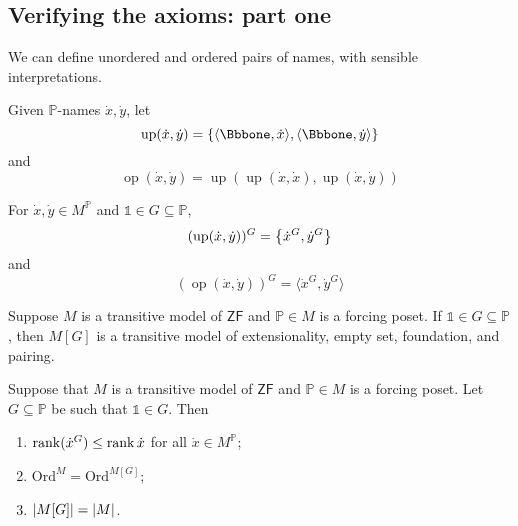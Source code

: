 \subsection{Verifying the axioms: part one}
We can define unordered and ordered pairs of names, with sensible interpretations.
\begin{definition}
    Given \( \mathbb P \)-names \( \dot x, \dot y \), let
    \[ \operatorname{up}(\dot x, \dot y) = \qty{\langle \Bbbone, \dot x \rangle, \langle \Bbbone, \dot y \rangle} \]
    and
    \[ \operatorname{op}(\dot x, \dot y) = \operatorname{up}(\operatorname{up}(\dot x, \dot x), \operatorname{up}(\dot x, \dot y)) \]
\end{definition}
\begin{proposition}
    For \( \dot x, \dot y \in M^{\mathbb P} \) and \( \Bbbone \in G \subseteq \mathbb P \),
    \[ (\operatorname{up}(\dot x, \dot y))^G = \qty{\dot x^G, \dot y^G} \]
    and
    \[ (\operatorname{op}(\dot x, \dot y))^G = \langle \dot x^G, \dot y^G \rangle \]
\end{proposition}
\begin{lemma}
    Suppose \( M \) is a transitive model of \( \mathsf{ZF} \) and \( \mathbb P \in M \) is a forcing poset.
    If \( \Bbbone \in G \subseteq \mathbb P \), then \( M[G] \) is a transitive model of extensionality, empty set, foundation, and pairing.
\end{lemma}
\begin{lemma}
    Suppose that \( M \) is a transitive model of \( \mathsf{ZF} \) and \( \mathbb P \in M \) is a forcing poset.
    Let \( G \subseteq \mathbb P \) be such that \( \Bbbone \in G \).
    Then
    \begin{enumerate}
        \item \( \rank (\dot x^G) \leq \rank \dot x \) for all \( \dot x \in M^{\mathbb P} \);
        \item \( \mathrm{Ord}^M = \mathrm{Ord}^{M[G]} \);
        \item \( \abs{M[G]} = \abs{M} \).
    \end{enumerate}
\end{lemma}
